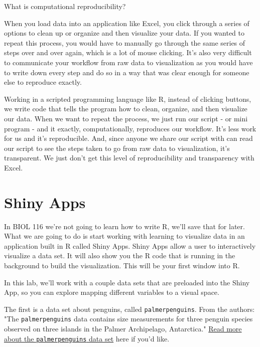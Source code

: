 \documentclass[
]{book}
\begin{document}
What is computational reproducibility?

When you load data into an application like Excel, you click through a series of options to clean up or organize and then visualize your data. If you wanted to repeat this process, you would have to manually go through the same series of steps over and over again, which is a lot of mouse clicking. It's also very difficult to communicate your workflow from raw data to visualization as you would have to write down every step and do so in a way that was clear enough for someone else to reproduce exactly.

Working in a scripted programming language like R, instead of clicking buttons, we write code that tells the program how to clean, organize, and then visualize our data. When we want to repeat the process, we just run our script - or mini program - and it exactly, computationally, reproduces our workflow. It's less work for us and it's reproducible. And, since anyone we share our script with can read our script to see the steps taken to go from raw data to visualization, it's transparent. We just don't get this level of reproducibility and transparency with Excel.

\hypertarget{shiny-apps}{%
\chapter*{Shiny Apps}\label{shiny-apps}}

In BIOL 116 we're not going to learn how to write R, we'll save that for later. What we are going to do is start working with learning to visualize data in an application built in R called Shiny Apps. Shiny Apps allow a user to interactively visualize a data set. It will also show you the R code that is running in the background to build the visualization. This will be your first window into R.

In this lab, we'll work with a couple data sets that are preloaded into the Shiny App, so you can explore mapping different variables to a visual space.

The first is a data set about penguins, called \texttt{palmerpenguins}. From the authors: "The \texttt{palmerpenguins} data contains size measurements for three penguin species observed on three islands in the Palmer Archipelago, Antarctica." \href{https://www.rdocumentation.org/packages/palmerpenguins/versions/0.1.0}{Read more about the \texttt{palmerpenguins} data set} here if you'd like.
\end{document}
